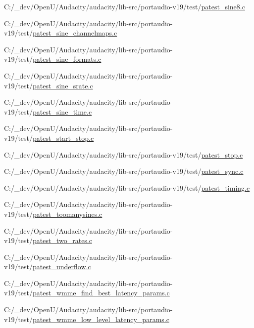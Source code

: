 \begin{DoxyCompactItemize}
C\+:/\+\_\+dev/\+Open\+U/\+Audacity/audacity/lib-\/src/portaudio-\/v19/test/\hyperlink{patest__sine8_8c}{patest\+\_\+sine8.\+c}\item 
C\+:/\+\_\+dev/\+Open\+U/\+Audacity/audacity/lib-\/src/portaudio-\/v19/test/\hyperlink{patest__sine__channelmaps_8c}{patest\+\_\+sine\+\_\+channelmaps.\+c}\item 
C\+:/\+\_\+dev/\+Open\+U/\+Audacity/audacity/lib-\/src/portaudio-\/v19/test/\hyperlink{patest__sine__formats_8c}{patest\+\_\+sine\+\_\+formats.\+c}\item 
C\+:/\+\_\+dev/\+Open\+U/\+Audacity/audacity/lib-\/src/portaudio-\/v19/test/\hyperlink{patest__sine__srate_8c}{patest\+\_\+sine\+\_\+srate.\+c}\item 
C\+:/\+\_\+dev/\+Open\+U/\+Audacity/audacity/lib-\/src/portaudio-\/v19/test/\hyperlink{patest__sine__time_8c}{patest\+\_\+sine\+\_\+time.\+c}\item 
C\+:/\+\_\+dev/\+Open\+U/\+Audacity/audacity/lib-\/src/portaudio-\/v19/test/\hyperlink{patest__start__stop_8c}{patest\+\_\+start\+\_\+stop.\+c}\item 
C\+:/\+\_\+dev/\+Open\+U/\+Audacity/audacity/lib-\/src/portaudio-\/v19/test/\hyperlink{patest__stop_8c}{patest\+\_\+stop.\+c}\item 
C\+:/\+\_\+dev/\+Open\+U/\+Audacity/audacity/lib-\/src/portaudio-\/v19/test/\hyperlink{patest__sync_8c}{patest\+\_\+sync.\+c}\item 
C\+:/\+\_\+dev/\+Open\+U/\+Audacity/audacity/lib-\/src/portaudio-\/v19/test/\hyperlink{patest__timing_8c}{patest\+\_\+timing.\+c}\item 
C\+:/\+\_\+dev/\+Open\+U/\+Audacity/audacity/lib-\/src/portaudio-\/v19/test/\hyperlink{patest__toomanysines_8c}{patest\+\_\+toomanysines.\+c}\item 
C\+:/\+\_\+dev/\+Open\+U/\+Audacity/audacity/lib-\/src/portaudio-\/v19/test/\hyperlink{patest__two__rates_8c}{patest\+\_\+two\+\_\+rates.\+c}\item 
C\+:/\+\_\+dev/\+Open\+U/\+Audacity/audacity/lib-\/src/portaudio-\/v19/test/\hyperlink{patest__underflow_8c}{patest\+\_\+underflow.\+c}\item 
C\+:/\+\_\+dev/\+Open\+U/\+Audacity/audacity/lib-\/src/portaudio-\/v19/test/\hyperlink{patest__wmme__find__best__latency__params_8c}{patest\+\_\+wmme\+\_\+find\+\_\+best\+\_\+latency\+\_\+params.\+c}\item 
C\+:/\+\_\+dev/\+Open\+U/\+Audacity/audacity/lib-\/src/portaudio-\/v19/test/\hyperlink{patest__wmme__low__level__latency__params_8c}{patest\+\_\+wmme\+\_\+low\+\_\+level\+\_\+latency\+\_\+params.\+c}\end{DoxyCompactItemize}
